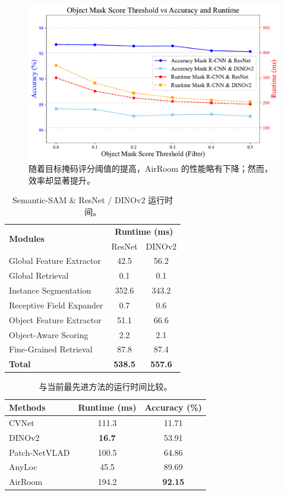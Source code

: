 \begin{figure}[ht]
    \centering
    \includegraphics[width=\columnwidth]{runtime.pdf}
    \caption{随着目标掩码评分阈值的提高，AirRoom 的性能略有下降；然而，效率却显著提升。}
    \label{fig:runtime}
\end{figure}

\begin{table}[ht]
\centering
\begin{tabular}{l|cc}
\toprule
\multirow{2}{*}{\textbf{Modules}} & \multicolumn{2}{c}{\textbf{Runtime (ms)}} \\
 & ResNet & DINOv2 \\
\midrule
Global Feature Extractor & 42.5 & 56.2 \\
Global Retrieval & 0.1 & 0.1 \\
Instance Segmentation & 352.6 & 343.2 \\
Receptive Field Expander & 0.7 & 0.6 \\
Object Feature Extractor & 51.1 & 66.6 \\
Object-Aware Scoring & 2.2 & 2.1 \\
Fine-Grained Retrieval & 87.8 & 87.4 \\
\midrule
\textbf{Total} & \textbf{538.5} & \textbf{557.6} \\
\bottomrule
\end{tabular}
\caption{Semantic-SAM \& ResNet / DINOv2 运行时间。}
\label{tab:module_runtime_ssam}
\end{table}

\begin{table}[ht]
\centering
\begin{tabular}{l|c|c}
\toprule
\textbf{Methods} & \textbf{Runtime (ms)} & \textbf{Accuracy (\%)}\\
\midrule
CVNet & 111.3 & 11.71 \\
DINOv2 & \textbf{16.7} & 53.91 \\
Patch-NetVLAD & 100.5 & 64.86 \\
AnyLoc & 45.5 & 89.69 \\
\rowcolor{Lavender} AirRoom & 194.2 & \textbf{92.15} \\
\bottomrule
\end{tabular}
\caption{与当前最先进方法的运行时间比较。}
\label{tab:runtime_comparison}
\end{table}

